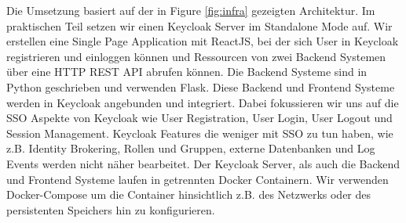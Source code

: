 \documentclass[12pt]{article}
\begin{document}
Die Umsetzung basiert auf der in Figure \ref{fig:infra} gezeigten Architektur. Im praktischen Teil setzen wir einen Keycloak Server im Standalone Mode auf. Wir erstellen eine Single Page Application mit ReactJS, bei der sich User in Keycloak registrieren und einloggen können und Ressourcen von zwei Backend Systemen über eine HTTP REST API abrufen können. Die Backend Systeme sind in Python geschrieben und verwenden Flask. Diese Backend und Frontend Systeme werden in Keycloak angebunden und integriert. Dabei fokussieren wir uns auf die SSO Aspekte von Keycloak wie User Registration, User Login, User Logout und Session Management. Keycloak Features die weniger mit SSO zu tun haben, wie z.B. Identity Brokering, Rollen und Gruppen, externe Datenbanken und Log Events werden nicht näher bearbeitet. Der Keycloak Server, als auch die Backend und Frontend Systeme laufen in getrennten Docker Containern. Wir verwenden Docker-Compose um die Container hinsichtlich z.B. des Netzwerks oder des persistenten Speichers hin zu konfigurieren.



	
\end{document}

